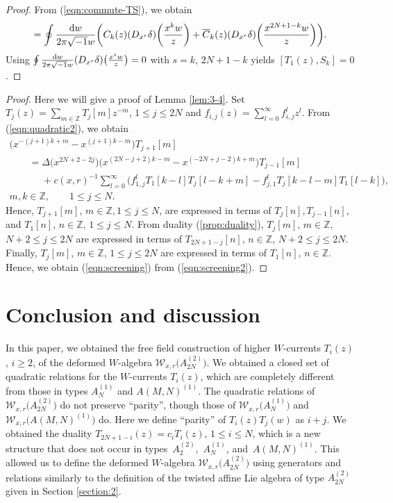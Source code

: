 \documentclass[pdftex]{sigma}
\numberwithin{equation}{section}
\begin{document}
\begin{proof}
From (\ref{eqn:commute-TS}), we obtain
\begin{gather*}
[T_1(z), S_k]=\oint \frac{{\rm d}w}{2\pi \sqrt{-1}w}
\bigg(C_k(z)(D_{x^{r}}\delta)\bigg(\frac{x^{k}w}{z}\bigg)+\overline{C}_k(z)
(D_{x^{r}}\delta)\bigg(\frac{x^{2N+1-k}w}{z}\bigg)\bigg).
\end{gather*}
Using
$\oint \frac{{\rm d}w}{2\pi \sqrt{-1}w}
(D_{x^{r}}\delta)\big(\frac{x^{s}w}{z}\big)=0$ with $s=k$, $2N+1-k$
yields $[T_1(z), S_k]=0$.
\end{proof}

\begin{proof}
Here we will give a proof of Lemma \ref{lem:3-4}.
Set $T_j(z)=\sum_{m \in \mathbb{Z}}T_j[m]z^{-m}$,
$1\leq j \leq 2N$ and $f_{i,j}(z)=\sum_{l=0}^\infty f_{i,j}^lz^l$.
From (\ref{eqn:quadratic2}), we obtain
\begin{gather*}
\big(x^{-(j+1)k+m}-x^{(j+1)k-m}\big)T_{j+1}[m]
\\ \qquad
{}=\Delta\big(x^{2N+2-2j}\big)\big(x^{(2N-j+2)k-m}-x^{(-2N+j-2)k+m}\big)T_{j-1}[m]
\\ \qquad\phantom{=}
{}+c(x,r)^{-1}\sum_{l=0}^\infty
\big(f_{1,j}^l T_1[k-l]T_j[l-k+m]-f_{j,1}^l
T_j[k-l-m]T_1[l-k]\big),
\\
m, k\in \mathbb{Z},\qquad
1\leq j \leq N.
\end{gather*}
Hence, $T_{j+1}[m]$, $m \in \mathbb{Z}, 1\leq j \leq N$,
are expressed in terms of $T_{j}[n], T_{j-1}[n]$,
and $T_{1}[n]$, $n \in \mathbb{Z}$, $1\leq j \leq N$.
From duality (\ref{prop:duality}),
$T_j[m]$, $m \in \mathbb{Z}$, $N+2 \leq j \leq 2N$
are expressed in terms of $T_{2N+1-j}[n]$, $n \in \mathbb{Z}$,
$N+2\leq j \leq 2N$.
Finally, $T_{j}[m]$, $m \in \mathbb{Z}$, $1\leq j \leq 2N$
are expressed in terms of $T_1[n]$, $n \in \mathbb{Z}$.
Hence, we obtain (\ref{eqn:screening}) from (\ref{eqn:screening2}).
\end{proof}

\section{Conclusion and discussion}
\label{section:5}

In this paper, we obtained the free field construction of
higher $W$-currents $T_i(z)$, $i \geq 2$,
of the deformed $W$-algebra ${\mathcal W}_{x,r}\big(A_{2N}^{(2)}\big)$.
We obtained a closed set of quadratic relations for the $W$-currents $T_i(z)$,
which are completely different from those in types $A_N^{(1)}$ and $A(M,N)^{(1)}$.
The quadratic relations of ${\mathcal W}_{x,r}\big(A_{2N}^{(2)}\big)$
do not preserve ``parity'', though those of ${\mathcal W}_{x,r}\big(A_N^{(1)}\big)$
and ${\mathcal W}_{x,r}\big(A(M,N)^{(1)}\big)$ do. Here we define
``parity'' of $T_i(z)T_j(w)$ as $i+j$.
We obtained the duality $T_{2N+1-i}(z)=c_i T_{i}(z)$, $1 \leq i \leq N$, which
is a new structure that does not occur in
types~$A_2^{(2)}$,~$A_N^{(1)}$, and~$A(M,N)^{(1)}$.
This allowed us to define the deformed $W$-algebra
${\mathcal W}_{x,r}\big(A_{2N}^{(2)}\big)$ using generators and relations
similarly to the definition of the twisted affine {Lie} algebra
of type $A_{2N}^{(2)}$ given in Section \ref{section:2}.
\end{document}
